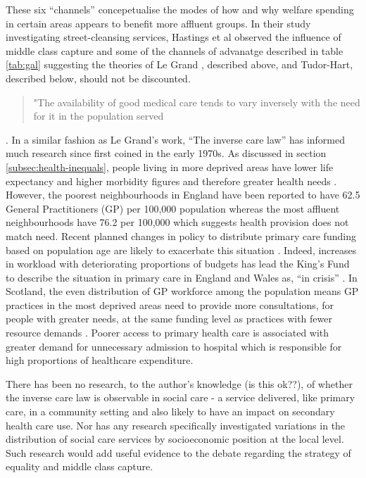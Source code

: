 \documentclass[12pt,]{report}
\begin{document}
These six ``channels'' concepetualise the modes of how and why welfare
spending in certain areas appears to benefit more affluent groups. In
their study investigating street-cleansing services, Hastings et al
\citeyearpar{RN116} observed the influence of middle class capture and
some of the channels of advanatge described in table \ref{tab:gal}
suggesting the theories of Le Grand \citeyearpar{RN175}, described
above, and Tudor-Hart, described below, should not be discounted.

\begin{quote} "The availability of good medical care tends to vary inversely with the need for it in the population served\end{quote}

\citep{RN120}. In a similar fashion as Le Grand's work, ``The inverse
care law'' has informed much research since first coined in the early
1970s. As discussed in section \ref{subsec:health-inequals}, people
living in more deprived areas have lower life expectancy and higher
morbidity figures and therefore greater health needs \citep{RN37}.
However, the poorest neighbourhoods in England have been reported to
have 62.5 General Practitioners (GP) per 100,000 population whereas the
most affluent neighbourhoods have 76.2 per 100,000 \citep{RN317} which
suggests health provision does not match need. Recent planned changes in
policy to distribute primary care funding based on population age are
likely to exacerbate this situation \citep{RN39}. Indeed, increases in
workload with deteriorating proportions of budgets has lead the King's
Fund to describe the situation in primary care in England and Wales as,
``in crisis'' \citep[pp.3]{RN318}. In Scotland, the even distribution of
GP workforce among the population means GP practices in the most
deprived areas need to provide more consultations, for people with
greater needs, at the same funding level as practices with fewer
resource demands \citep{RN148, RN27}. Poorer access to primary health
care is associated with greater demand for unnecessary admission to
hospital \citep{RN49, RN268} which is responsible for high proportions
of healthcare expenditure.

There has been no research, to the author's knowledge (is this ok??), of
whether the inverse care law is observable in social care - a service
delivered, like primary care, in a community setting and also likely to
have an impact on secondary health care use. Nor has any research
specifically investigated variations in the distribution of social care
services by socioeconomic position at the local level. Such research
would add useful evidence to the debate regarding the strategy of
equality and middle class capture.
\end{document}
